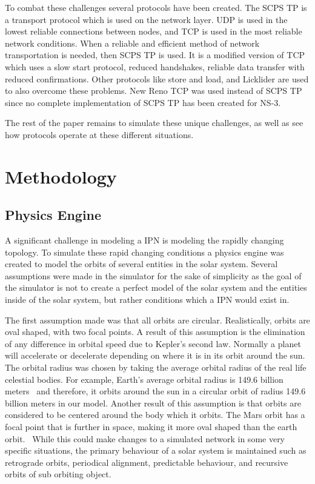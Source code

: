 \documentclass[a4paper,12pt]{article}
\begin{document}
To combat these challenges several protocols have been created. The SCPS TP is a
transport protocol which is used on the network layer. UDP is used in the lowest
reliable connections between nodes, and TCP is used in the most reliable network
conditions. When a reliable and efficient method of network transportation is
needed, then SCPS TP is used. It is a modified version of TCP which uses a slow
start protocol, reduced handshakes, reliable data transfer with reduced
confirmations. Other protocols like store and load, and Licklider are used to
also overcome these problems. New Reno TCP was used instead of SCPS TP since no
complete implementation of SCPS TP has been created for NS-3.

The rest of the paper remains to simulate these unique challenges, as well as
see how protocols operate at these different situations.

\section{Methodology}

\subsection{Physics Engine}

A significant challenge in modeling a IPN is modeling the rapidly changing
topology. To simulate these rapid changing conditions a physics engine was
created to model the orbits of several entities in the solar system. Several
assumptions were made in the simulator for the sake of simplicity as the goal of
the simulator is not to create a perfect model of the solar system and the
entities inside of the solar system, but rather conditions which a IPN would
exist in.

The first assumption made was that all orbits are circular. Realistically,
orbits are oval shaped, with two focal points. A result of this assumption is
the elimination of any difference in orbital speed due to Kepler's second law.
Normally a planet will accelerate or decelerate depending on where it is in its
orbit around the sun. The orbital radius was chosen by taking the average
orbital radius of the real life celestial bodies. For example, Earth's average
orbital radius is 149.6 billion meters~\cite{nasa_earth} and therefore, it
orbits around the sun in a circular orbit of radius 149.6 billion meters in our
model. Another result of this assumption is that orbits are considered to be
centered around the body which it orbits. The Mars orbit has a focal point that
is further in space, making it more oval shaped than the earth
orbit.~\cite{nasa_mars} While this could make changes to a simulated network in
some very specific situations, the primary behaviour of a solar system is
maintained such as retrograde orbits, periodical alignment, predictable
behaviour, and recursive orbits of sub orbiting object.
\end{document}
